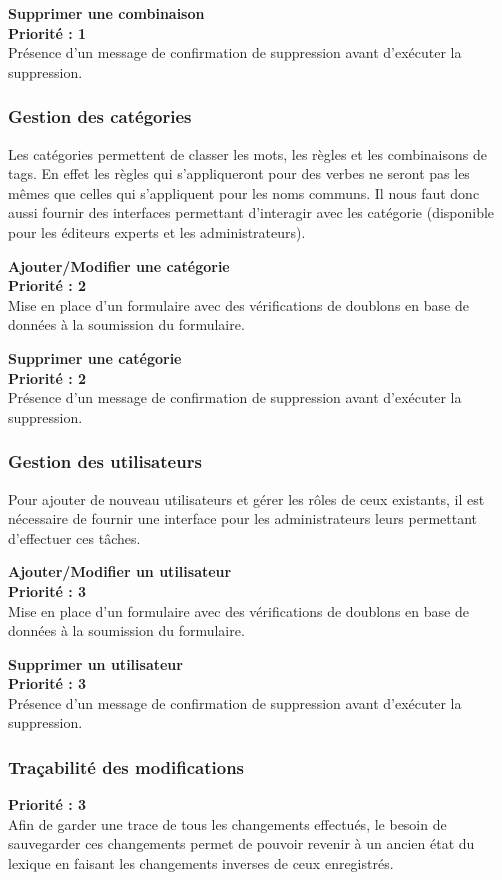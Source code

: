 \documentclass[12pt,a4paper]{article}
\begin{document}
\textbf{Supprimer une combinaison} \\ 
\textbf{Priorité : 1} \\
Présence d'un message de confirmation de suppression avant d'exécuter la suppression.
 
\subsubsection{Gestion des catégories}

Les catégories permettent de classer les mots, les règles et les combinaisons de tags. En effet les règles qui s'appliqueront pour des verbes ne seront pas les mêmes que celles qui s'appliquent pour les noms communs.
Il nous faut donc aussi fournir des interfaces permettant d'interagir avec les catégorie (disponible pour les éditeurs experts et les administrateurs).

\textbf{Ajouter/Modifier une catégorie} \\ 
\textbf{Priorité : 2 } \\
Mise en place d'un formulaire avec des vérifications de doublons en base de données à la soumission du formulaire.

\textbf{Supprimer une catégorie} \\ 
\textbf{Priorité : 2 } \\
Présence d'un message de confirmation de suppression avant d'exécuter la suppression.

\subsubsection{Gestion des utilisateurs} 
Pour ajouter de nouveau utilisateurs et gérer les rôles de ceux existants, il est nécessaire de fournir une interface pour les administrateurs leurs permettant d'effectuer ces tâches.

\textbf{Ajouter/Modifier un utilisateur} \\ 
\textbf{Priorité : 3 } \\
Mise en place d'un formulaire avec des vérifications de doublons en base de données à la soumission du formulaire.

\textbf{Supprimer un utilisateur} \\ 
\textbf{Priorité : 3 } \\
Présence d'un message de confirmation de suppression avant d'exécuter la suppression.

\subsubsection{Traçabilité des modifications} 
\textbf{Priorité : 3} \\
Afin de garder une trace de tous les changements effectués, le besoin de sauvegarder ces changements permet de pouvoir revenir à un ancien état du lexique en faisant les changements inverses de ceux enregistrés.
\end{document}
